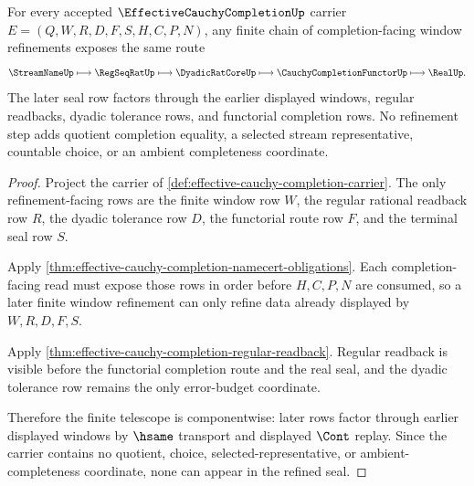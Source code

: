\begin{theorem}\label{thm:effective-cauchy-completion-window-telescope}
For every accepted $\EffectiveCauchyCompletionUp$ carrier $E=(Q,W,R,D,F,S,H,C,P,N)$, any finite chain of completion-facing window refinements exposes the same route
$$
\StreamNameUp \longmapsto \RegSeqRatUp \longmapsto \DyadicRatCoreUp \longmapsto \CauchyCompletionFunctorUp \longmapsto \RealUp .
$$
The later seal row factors through the earlier displayed windows, regular readbacks, dyadic tolerance rows, and functorial completion rows. No refinement step adds quotient completion equality, a selected stream representative, countable choice, or an ambient completeness coordinate.
\end{theorem}
\begin{proof}
Project the carrier of \autoref{def:effective-cauchy-completion-carrier}. The only refinement-facing rows are the finite window row $W$, the regular rational readback row $R$, the dyadic tolerance row $D$, the functorial route row $F$, and the terminal seal row $S$.

Apply \autoref{thm:effective-cauchy-completion-namecert-obligations}. Each completion-facing read must expose those rows in order before $H,C,P,N$ are consumed, so a later finite window refinement can only refine data already displayed by $W,R,D,F,S$.

Apply \autoref{thm:effective-cauchy-completion-regular-readback}. Regular readback is visible before the functorial completion route and the real seal, and the dyadic tolerance row remains the only error-budget coordinate.

Therefore the finite telescope is componentwise: later rows factor through earlier displayed windows by $\hsame$ transport and displayed $\Cont$ replay. Since the carrier contains no quotient, choice, selected-representative, or ambient-completeness coordinate, none can appear in the refined seal.
\end{proof}

